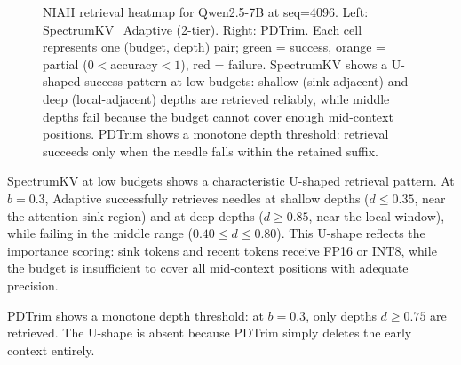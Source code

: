 \documentclass[11pt]{article}
\newcommand{\method}{SpectrumKV}
\newcommand{\budget}{b}
\theoremstyle{plain}
\theoremstyle{definition}
\begin{document}
\begin{figure}[t]
\caption{NIAH retrieval heatmap for Qwen2.5-7B at seq=4096.  Left: \method{}\_Adaptive (2-tier).  Right: PDTrim.  Each cell represents one (budget, depth) pair; green = success, orange = partial ($0 < $accuracy$ < 1$), red = failure.  \method{} shows a U-shaped success pattern at low budgets: shallow (sink-adjacent) and deep (local-adjacent) depths are retrieved reliably, while middle depths fail because the budget cannot cover enough mid-context positions.  PDTrim shows a monotone depth threshold: retrieval succeeds only when the needle falls within the retained suffix.}
\label{fig:niah-heatmap}
\end{figure}

\method{} at low budgets shows a characteristic U-shaped retrieval pattern.  At $\budget=0.3$, Adaptive successfully retrieves needles at shallow depths ($d \le 0.35$, near the attention sink region) and at deep depths ($d \ge 0.85$, near the local window), while failing in the middle range ($0.40 \le d \le 0.80$).  This U-shape reflects the importance scoring: sink tokens and recent tokens receive FP16 or INT8, while the budget is insufficient to cover all mid-context positions with adequate precision.

PDTrim shows a monotone depth threshold: at $\budget=0.3$, only depths $d \ge 0.75$ are retrieved.  The U-shape is absent because PDTrim simply deletes the early context entirely.
\end{document}
